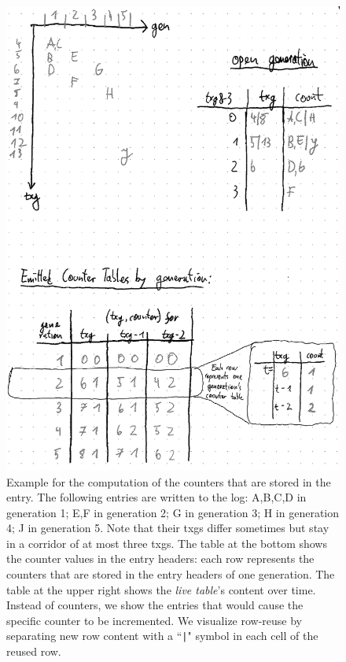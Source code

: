 \documentclass[12pt,a4paper,twoside]{book}
\begin{document}
\begin{figure}[H]
    \centering
    \includegraphics{fig/prb_counters_table__example}
    \caption{
        Example for the computation of the counters that are stored in the entry.
        The following entries are written to the log:
        A,B,C,D in generation 1; E,F in generation 2; G in generation 3; H in generation 4; J in generation 5.
        Note that their txgs differ sometimes but stay in a corridor of at most three txgs.
        The table at the bottom shows the counter values in the entry headers:
        each row represents the counters that are stored in the entry headers of one generation.
        The table at the upper right shows the \textit{live table}'s content over time.
        Instead of counters, we show the entries that would cause the specific counter to be incremented.
        We visualize row-reuse by separating new row content with a ``\lstinline{|}" symbol in each cell of the reused row.
    }
    \label{fig:prb_counters_table__example}
\end{figure}
\end{document}
